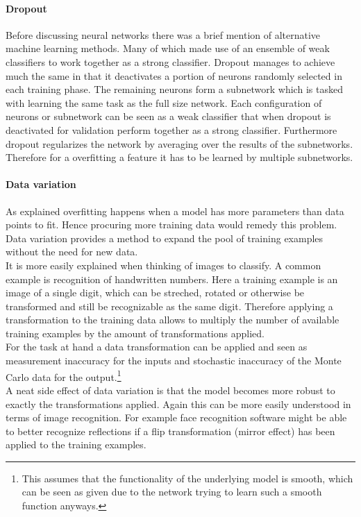 				\paragraph{Dropout}
					Before discussing neural networks there was a brief mention of alternative machine learning methods. Many of which made use of an ensemble of weak classifiers to work together as a strong classifier. Dropout manages to achieve much the same in that it deactivates a portion of neurons randomly selected in each training phase. The remaining neurons form a subnetwork which is tasked with learning the same task as the full size network. Each configuration of neurons or subnetwork can be seen as a weak classifier that when dropout is deactivated for validation perform together as a strong classifier. Furthermore dropout regularizes the network by averaging over the results of the subnetworks. Therefore for a overfitting a feature it has to be learned by multiple subnetworks.
				\paragraph{Data variation}
					As explained overfitting happens when a model has more parameters than data points to fit. Hence procuring more training data would remedy this problem. Data variation provides a method to expand the pool of training examples without the need for new data.\\
					It is more easily explained when thinking of images to classify. A common example is recognition of handwritten numbers. Here a training example is an image of a single digit, which can be streched, rotated or otherwise be transformed and still be recognizable as the same digit. Therefore applying a transformation to the training data allows to multiply the number of available training examples by the amount of transformations applied.\\
					For the task at hand a data transformation can be applied and seen as measurement inaccuracy for the inputs and stochastic inaccuracy of the Monte Carlo data for the output.\footnote{This assumes that the functionality of the underlying model is smooth, which can be seen as given due to the network trying to learn such a smooth function anyways.}\\
					A neat side effect of data variation is that the model becomes more robust to exactly the transformations applied. Again this can be more easily understood in terms of image recognition. For example face recognition software might be able to better recognize reflections if a flip transformation (mirror effect) has been applied to the training examples.

